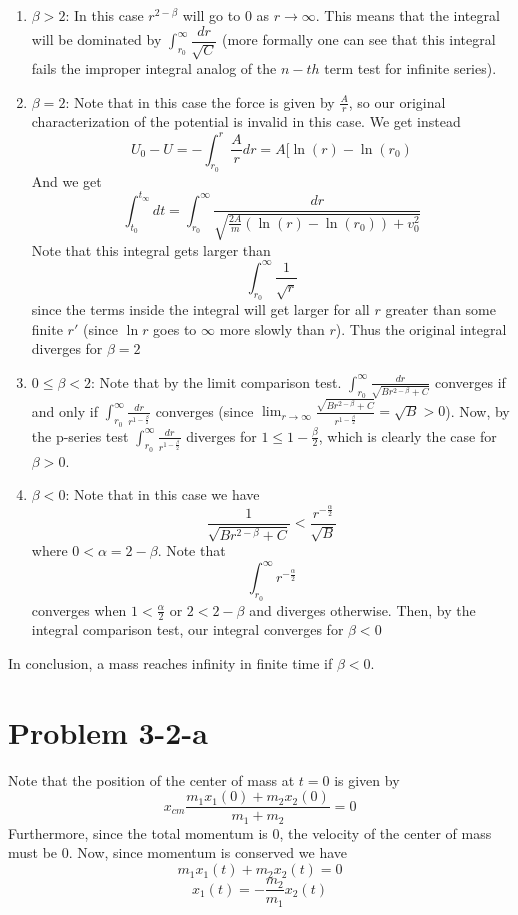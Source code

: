 \begin{enumerate}
\item $\beta>2$:
In this case $r^{2-\beta}$ will go to $0$ as $r\to\infty$. This means that the integral will be dominated by $\int_{r_0}^\infty \dfrac{dr}{\sqrt{C}}$ (more formally one can see that this integral fails the improper integral analog of the $n-th$ term test for infinite series). 
\item $\beta=2$: Note that in this case the force is given by 
$\frac{A}{r} $, so our original characterization of the potential is invalid in this case.
We get instead 
\[ U_0 - U = -\int_{r_0}^r \frac{A}{r} dr = A[\ln(r) - \ln(r_0)\]
And we get
\[ \int_{t_0}^{t_\infty} dt = \int_{r_0}^\infty \dfrac{dr}{\sqrt{\frac{2A}{m}(\ln(r)-\ln(r_0)) + v_0^2}} \]
Note that this integral gets larger than
\[
\int_{r_0}^\infty \frac{1}{\sqrt{r}}
\] 
since the terms inside the integral will get larger for all $r$ greater than some finite $r'$ (since $\ln r$ goes to $\infty$ more slowly than $r$). Thus the original integral diverges for $\beta = 2$
\item $0\leq \beta < 2$:
Note that by the limit comparison test. $\int_{r_0}^\infty \frac{dr}{\sqrt{Br^{2-\beta}+C}}$ converges if and only if $\int_{r_0}^\infty  \frac{dr}{r^{1-\frac{\beta}{2}}}$ converges (since $\lim_{r\to \infty} \frac{\sqrt{Br^{2-\beta}+C}}{r^{1-\frac{\beta}{2}}} = \sqrt{B} > 0$). Now, by the p-series test $\int_{r_0}^\infty  \frac{dr}{r^{1-\frac{\beta}{2}}}$ diverges for $1\leq 1-\frac{\beta}{2}$, which is clearly the case for $\beta>0$.
\item $\beta<0$:
Note that in this case we have
\[ \frac{1}{\sqrt{Br^{2-\beta}+C}} < \frac{r^{-\frac{\alpha}{2}} }{\sqrt{B}} \]
where $0 < \alpha = 2-\beta$. Note that 
\[ \int_{r_0}^\infty r^{-\frac{\alpha}{2}} \]
converges when $1<\frac{\alpha}{2}$ or $2<2-\beta$ and diverges otherwise. Then, by the integral comparison test, our integral converges for $\beta<0$
\end{enumerate}
In conclusion, a mass reaches infinity in finite time if $\beta<0$.
\section*{Problem 3-2-a}
Note that the position of the center of mass at $t=0$ is given by 
\[ x_{cm} \dfrac{m_1x_1(0)+m_2x_2(0)}{m_1+m_2} = 0 \]
Furthermore, since the total momentum is $0$, the velocity of the center of mass must be $0$. 
Now, since momentum is conserved we have 
\[ m_1 x_1(t) + m_2 x_2(t) = 0 \]
\[ x_1(t) = - \frac{m_2}{m_1} x_2(t) \]
